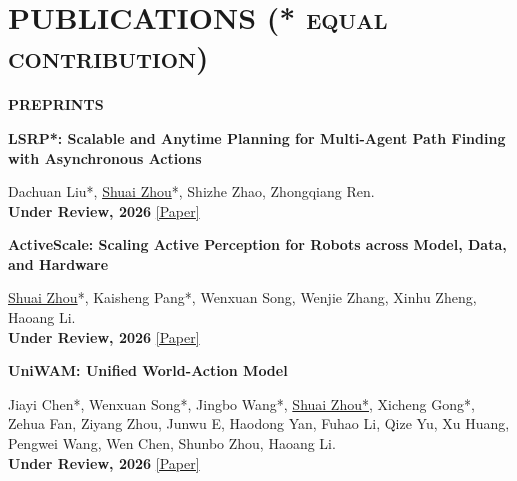 \documentclass[a4paper,9pt]{extarticle}
\newenvironment{publicationlist}[1]{%
    \renewcommand{\theenumi}{#1\arabic{enumi}}%
    \renewcommand{\labelenumi}{[\theenumi]}%
    \begin{etaremune}[leftmargin=2.8em,labelwidth=2.3em,labelsep=0.5em,
        itemsep=0pt,parsep=0pt]%
}{%
    \end{etaremune}%
}
\begin{document}
\section*{{\textbf{\fontsize{14pt}{8pt}\selectfont P}\textbf{\scshape UBLICATIONS (* equal contribution)}}}
\vspace{-0.10in}
{\textbf{\fontsize{12pt}{4pt}\selectfont P}\textbf{\scshape REPRINTS}}
\vspace{-0.05in}
\begin{publicationlist}{P}
\item{}\label{pub:lsrp-star} \textbf{LSRP*: Scalable and Anytime Planning for Multi-Agent Path Finding with Asynchronous Actions}
\par\textup{Dachuan Liu*, \underline{Shuai Zhou}*, Shizhe Zhao, Zhongqiang Ren. \\ \textbf{Under Review, 2026} \href{https://arxiv.org/abs/2611.10363}{[Paper]}}
\item{}\label{pub:activescale} \textbf{ActiveScale: Scaling Active Perception for Robots across
Model, Data, and Hardware}
\par\textup{\underline{Shuai Zhou}*, Kaisheng Pang*, Wenxuan Song, Wenjie Zhang, Xinhu Zheng, Haoang Li. \\ \textbf{Under Review, 2026}  \href{https://arxiv.org/abs/2609.18514}{[Paper]}}
\item{}\label{pub:uniwam} \textbf{UniWAM: Unified World-Action Model}
\par\textup{Jiayi Chen*, Wenxuan Song*, Jingbo Wang*, \underline{Shuai Zhou*}, Xicheng Gong*, Zehua Fan, Ziyang Zhou, Junwu E, Haodong Yan, Fuhao Li, Qize Yu, Xu Huang, Pengwei Wang, Wen Chen, Shunbo Zhou, Haoang Li. \\ \textbf{Under Review, 2026} \href{https://arxiv.org/abs/2610.02054}{[Paper]}}


\end{publicationlist}
\end{document}
